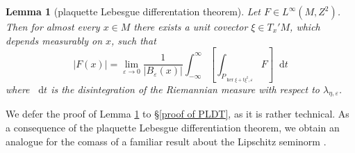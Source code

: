 \documentclass[reqno,11pt]{amsart}
\newcommand*\dif{\mathop{}\!\mathrm{d}}
\newtheorem{lemma}[theorem]{Lemma}
\theoremstyle{definition}
\numberwithin{equation}{section}
\begin{document}
\begin{lemma}[plaquette Lebesgue differentation theorem]\label{PLDT}
Let $F \in L^\infty(M, Z^2)$.
Then for almost every $x \in M$ there exists a unit covector $\xi \in T_x' M$, which depends measurably on $x$, such that
\begin{equation}\label{plaquette LDT}
|F(x)| = \lim_{\varepsilon \to 0} \frac{1}{|B_\varepsilon(x)|} \int_{-\infty}^\infty \left[\int_{P_{\ker \xi + t\xi^\sharp, \varepsilon}} F\right] \dif t
\end{equation}
where $\dif t$ is the disintegration of the Riemannian measure with respect to $\lambda_{\eta, \varepsilon}$.
\end{lemma}

We defer the proof of Lemma \ref{PLDT} to \S\ref{proof of PLDT}, as it is rather technical.
As a consequence of the plaquette Lebesgue differentiation theorem, we obtain an analogue for the comass of a familiar result about the Lipschitz seminorm \cite[Lemma 4.3]{Crandall2008}.
\end{document}
